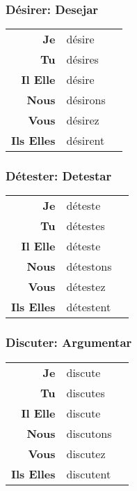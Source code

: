 \documentclass{subfiles}
\begin{document}
\begin{multicols*}{3}
        \subsubsection{Désirer: Desejar}
            \begin{tabular}{r l r}
                \textbf{Je}        & désire   &\\
                \textbf{Tu}        & désires  &\\
                \textbf{Il Elle}   & désire   &\\
                \textbf{Nous}      & désirons &\\
                \textbf{Vous}      & désirez  &\\
                \textbf{Ils Elles} & désirent &
            \end{tabular}

        \subsubsection{Détester: Detestar}
            \begin{tabular}{r l r}
                \textbf{Je}        & déteste   &\\
                \textbf{Tu}        & détestes  &\\
                \textbf{Il Elle}   & déteste   &\\
                \textbf{Nous}      & détestons &\\
                \textbf{Vous}      & détestez  &\\
                \textbf{Ils Elles} & détestent &
            \end{tabular}

        \subsubsection{Discuter: Argumentar}
            \begin{tabular}{r l r}
                \textbf{Je}        & discute   &\\
                \textbf{Tu}        & discutes  &\\
                \textbf{Il Elle}   & discute   &\\
                \textbf{Nous}      & discutons &\\
                \textbf{Vous}      & discutez  &\\
                \textbf{Ils Elles} & discutent &
            \end{tabular}


\end{multicols*}
\end{document}
